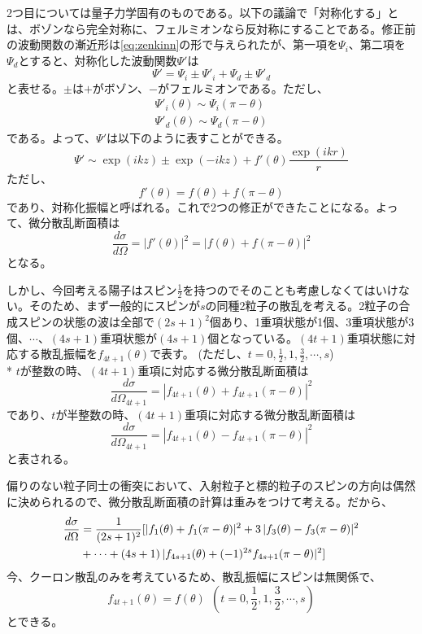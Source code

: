 \documentclass[a4paper,11pt,dvipdfmx]{jsarticle}
\begin{document}
2つ目については量子力学固有のものである。以下の議論で「対称化する」とは、ボゾンなら完全対称に、フェルミオンなら反対称にすることである。修正前の波動関数の漸近形は\eqref{eq:zenkinn}の形で与えられたが、第一項を$\Psi_{i}$、第二項を$\Psi_{d}$とすると、対称化した波動関数$\Psi'$は
\begin{equation*}
    \Psi'=\Psi_{i}\pm\Psi'_{i}+\Psi_{d}\pm\Psi'_{d}
\end{equation*}
と表せる。$\pm$は$+$がボゾン、$-$がフェルミオンである。ただし、
\begin{align*}
    \Psi'_{i}(\theta)\sim \Psi_{i}(\pi-\theta) \\
    \Psi'_{d}(\theta)\sim \Psi_{d}(\pi-\theta)
\end{align*}
である。よって、$\Psi'$は以下のように表すことができる。
\begin{equation}
    \Psi' \sim \exp(ikz) \pm \exp(-ikz)+f'(\theta)\frac{\exp(ikr)}{r} 
\end{equation}
ただし、
\begin{equation*}
    f'(\theta)=f(\theta)+f(\pi-\theta)
\end{equation*}
であり、対称化振幅と呼ばれる。これで2つの修正ができたことになる。よって、微分散乱断面積は
\begin{equation*}
    \frac{d\sigma}{d\Omega}=|f'(\theta)|^{2}=|f(\theta)+f(\pi-\theta)|^{2}
\end{equation*}
となる。

しかし、今回考える陽子はスピン$\tfrac{1}{2}$を持つのでそのことも考慮しなくてはいけない。そのため、まず一般的にスピンが$s$の同種2粒子の散乱を考える。2粒子の合成スピンの状態の波は全部で\((2s+1)^2\)個あり、1重項状態が1個、3重項状態が3個、$\cdots$、$(4s+1)$重項状態が$(4s+1)$個となっている。$(4t+1)$重項状態に対応する散乱振幅を$f_{4t+1}(\theta)$で表す。
(ただし、$t=0,\tfrac{1}{2},1,\tfrac{3}{2},\cdots,s$) \\*
$t$が整数の時、$(4t+1)$重項に対応する微分散乱断面積は
\begin{equation*}
    \frac{d\sigma}{d\Omega_{4t+1}}=|f_{4t+1}(\theta)+f_{4t+1}(\pi-\theta)|^2
\end{equation*}
であり、$t$が半整数の時、$(4t+1)$重項に対応する微分散乱断面積は
\begin{equation*}
    \frac{d\sigma}{d\Omega_{4t+1}}=|f_{4t+1}(\theta)-f_{4t+1}(\pi-\theta)|^2
\end{equation*}
と表される。

偏りのない粒子同士の衝突において、入射粒子と標的粒子のスピンの方向は偶然に決められるので、微分散乱断面積の計算は重みをつけて考える。だから、
\begin{align}
    \frac{d\sigma}{d\Omega} &= \frac{1}{(2s+1)^{2}}[|f_{1}(\theta)+f_{1}(\pi-\theta)|^{2}+3\,|f_{3}(\theta)-f_{3}(\pi-\theta)|^{2} \notag\\
    &+ \cdots +(4s+1)\,|f_{4s+1}(\theta)+(-1)^{2s}f_{4s+1}(\pi-\theta)|^{2}]\label{eq:spin}
\end{align}
今、クーロン散乱のみを考えているため、散乱振幅にスピンは無関係で、
\begin{equation}
    f_{4t+1}(\theta)=f(\theta)　\ \ (t=0,\frac{1}{2},1,\frac{3}{2},\cdots,s)\label{eq:mukankei}
\end{equation}
とできる。
\end{document}
